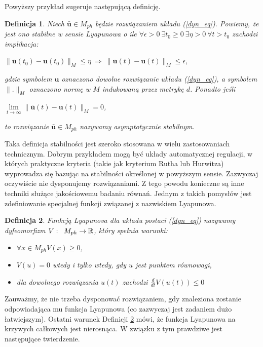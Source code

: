 \documentclass[12pt, twoside]{book}
\newtheorem{defi}{Definicja}
\begin{document}
Powyższy przykład sugeruje następującą definicję.
\begin{defi}\label{stable_point}
	Niech $ \bar{\textbf{u}} \in M_{ph} $ będzie rozwiązaniem układu (\ref{dyn_eq}). Powiemy, że jest ono stabilne w sensie Lyapunowa o ile $\forall \epsilon>0 \  \exists t_{0} \geq 0 \  \exists \eta>0 \  \forall t>t_{0}$ zachodzi implikacja:\newline
\centerline {$ 	\|\bar{\textbf{u}}(t_{0}) - \textbf{u}(t_{0}) \|_{M}  \leq \eta \  \Rightarrow \ \|\bar{\textbf{u}}(t) - \textbf{u}(t) \|_{M}  \leq \epsilon$,}
gdzie symbolem $ \textbf{u} $ oznaczono dowolne rozwiązanie układu (\ref{dyn_eq}), a symbolem $ \|.\|_{M}$ oznaczono normę w $ M $ indukowaną przez metrykę $ d $.\newline
Ponadto jeśli \newline
\centerline{$ \lim\limits_{t \rightarrow \infty}\|\bar{\textbf{u}}(t) - \textbf{u}(t) \|_{M} = 0$,}
to rozwiązanie $ \bar{\textbf{u}} \in M_{ph} $ nazywamy asymptotycznie stabilnym.
\end{defi}
Taka definicja stabilności jest szeroko stosowana w wielu zastosowaniach technicznym. Dobrym przykładem mogą być układy automatycznej regulacji, w których praktyczne kryteria (takie jak kryterium Rutha lub Hurwitza) wyprowadza się bazując na stabilności określonej w powyższym sensie.\newline
Zazwyczaj oczywiście nie dysponujemy rozwiązaniami. Z tego powodu konieczne są inne techniki służące jakościowemu badaniu równań. Jednym z takich pomysłów jest zdefiniowanie specjalnej funkcji związanej z nazwiskiem Lyapunowa.
\newline
\begin{defi}
	\label{Lyapnuv_function}
	Funkcją Lyapunova dla układu postaci (\ref{dyn_eq}) nazywamy dyfeomorfizm $ V:\thickspace\thickspace M_{ph} \rightarrow \mathbb{R} $, który spełnia warunki:
	\begin{itemize}
		\item $\forall x \in M_{ph} V(x) \geq 0$,
		\item $ V(u) = 0 $ wtedy i tylko wtedy, gdy $ u $ jest punktem równowagi,
		\item dla dowolnego rozwiązania $ u(t) $ zachodzi $ \frac{d}{dt}V(u(t)) \leq 0 $
	\end{itemize}
\end{defi}
Zauważmy, że nie trzeba dysponować rozwiązaniem, gdy znaleziona zostanie odpowiadająca mu funkcja Lyapunowa (co zazwyczaj jest zadaniem dużo łatwiejszym). Ostatni warunek  Definicji \ref{Lyapnuv_function} mówi, że funkcja Lyapunowa na krzywych całkowych jest nierosnąca. W związku z tym prawdziwe jest następujące twierdzenie.
\end{document}
